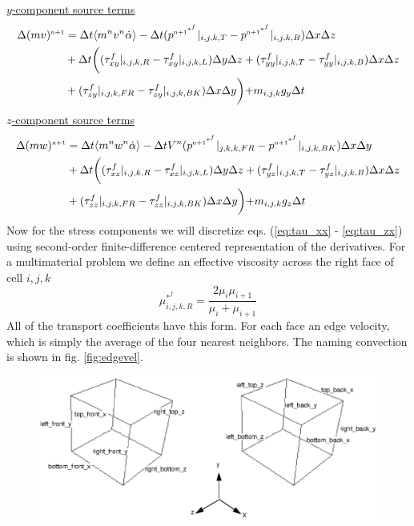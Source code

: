 \documentclass[fleqn]{article}
\begin{document}
{\underline{\textsf{$y$-component source terms}}\\
%
\begin{align*}
        \Delta{(m v)^{\nadv}}  &= 
        \delt \langle m^{n} v^n \dot{\alpha} \rangle 
    -   \delt (   \pstar|_{i,j,k,T} - \pstar|_{i,j,k,B})\delx \delz\\
&   +   \delt \biggr(
    (   \tau^{f}_{xy}|_{i,j,k,R} - \tau^{f}_{xy}|_{i,j,k,L})\dely \delz
    +(  \tau^{f}_{yy}|_{i,j,k,T} - \tau^{f}_{yy}|_{i,j,k,B})\delx \delz\\
&   +(  \tau^{f}_{zy}|_{i,j,k,FR} - \tau^{f}_{zy}|_{i,j,k,BK})\delx \dely \biggl)
    +   m_{i,j,k}g_y\delt
\end{align*}
%
\underline{\textsf{$z$-component source terms}}\\
%
\begin{align*}
        \Delta{(m w)^{\nadv}}   &= 
        \delt \langle m^{n} w^n \dot{\alpha} \rangle   
    -   \delt V^{n} 
    (   \pstar|_{j,k,k,FR} - \pstar|_{i,j,k,BK})\delx \dely\\
&   +   \delt\biggr(
    (   \tau^{f}_{xz}|_{i,j,k,R} - \tau^{f}_{xz}|_{i,j,k,L})\dely \delz
    +(  \tau^{f}_{yz}|_{i,j,k,T} - \tau^{f}_{yz}|_{i,j,k,B})\delx \delz\\
&   +(  \tau^{f}_{zz}|_{i,j,k,FR} - \tau^{f}_{zz}|_{i,j,k,BK})\delx \dely \biggl)
    +   m_{i,j,k}g_z\delt
\end{align*}
%
Now for the stress components we will discretize eqs. (\ref{eq:tau_xx} -
\ref{eq:tau_zx}) using second-order finite-difference centered representation
of the derivatives.  For a multimaterial problem we define an effective
viscosity across the right face of cell $i,j,k$
\begin{equation*}
\mu^{*^{f}}_{i,j,k,R} = \frac{2\mu_{i}\mu_{i+1}}{\mu_{i} + \mu_{i+1}}
\end{equation*}
All of the transport coefficients have this form.  For each face an edge
velocity, which is simply the average of the four nearest neighbors.
The naming convection is shown in fig. \ref{fig:edgevel}.
%
%
\begin{figure}
    \center
    \includegraphics[scale=.8]{edge_velocity.eps}

\end{figure}}
\end{document}
